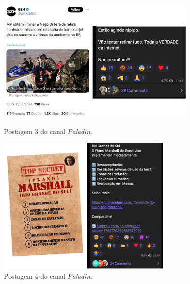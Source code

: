 \documentclass[portuguese]{textolivre}
\begin{document}
\begin{figure}[h!]
    \vspace{0.2cm} %
    
    \begin{minipage}[t]{0.50\textwidth}
        \centering
        \includegraphics[width=\linewidth]{Imagens/Fig25.png}
        \caption{Postagem 3 do canal \emph{Paladin}.}
        \label{fig-25}
    \end{minipage}
    \hfill
    \begin{minipage}[t]{0.46\textwidth}
        \centering
        \includegraphics[width=\linewidth]{Imagens/Fig26.png}
        \caption{Postagem 4 do canal \emph{Paladin}.}
        \label{fig-26}
    \end{minipage}
    
    \vspace{0.2cm} %
    

\end{figure}
\end{document}
